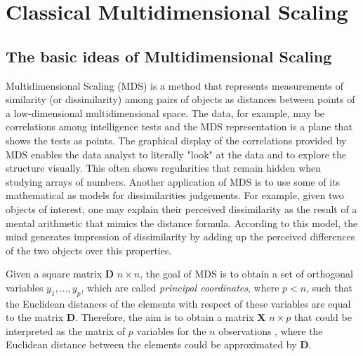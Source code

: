 \documentclass[11pt]{report}
\begin{document}




\thispagestyle{empty}






\clearpage



\tableofcontents



\chapter{Classical Multidimensional Scaling}
\section{The basic ideas of Multidimensional Scaling}
Multidimensional Scaling (MDS) is a method that represents measurements of 
similarity (or dissimilarity) among pairs of objects as distances between points
of a low-dimensional multidimensional space. The data, for example, may be 
correlations among intelligence tests and the MDS representation is a plane that
shows the tests as points. The graphical display of the correlations provided by MDS 
enables the data analyst to literally "look" at the data and to explore the 
structure visually. This often shows regularities that remain hidden when
studying arrays of numbers. Another application of MDS is to use some of its
mathematical as models for dissimilarities judgements. For example, given two
objects of interest, one may explain their perceived dissimilarity as the result
of a mental arithmetic that mimics the distance formula. According to this model,
the mind generates impression of dissimilarity by adding up the perceived 
differences of the two objects over this properties.

\indent Given a square matrix \textbf{D} $n\times n$, the goal of MDS is to 
obtain a set of orthogonal variables $y_1,...,y_p$, which are called 
\textit{principal coordinates}, where $p<n$, such that the Euclidean distances of
the elements with respect of these variables are equal to the matrix \textbf{D}. 
Therefore, the aim is to obtain a matrix \textbf{X} $n \times p$ that could be 
interpreted as the matrix of $p$ variables for the $n$ observations , where the 
Euclidean distance between the elements could be approximated by \textbf{D}.
\end{document}
